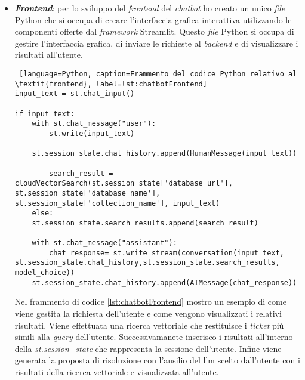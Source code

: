 \begin{itemize}
    Nel frammento di codice \ref{lst:cloudVectorSearch} mostro la funzione di ricerca vettoriale utilizzata nel \textit{chatbot}. Questa funzione si occupa di interrogare il \textit{database} vettoriale MongoDB fornendogli il nome dell'indice, il nome del campo contenente l'\gls{embedding-g} e l'\gls{embedding-g} del testo della \textit{query} dell'utente. La funzione restituisce i tre \textit{ticket} più simili alla \textit{query} dell'utente filtrandoli per i campi desiderati.
    \item \textbf{\textit{Frontend}}: per lo sviluppo del \textit{frontend} del \textit{chatbot} ho creato un unico \textit{file} Python che si occupa di creare l'interfaccia grafica interattiva utilizzando le componenti offerte dal \textit{framework} Streamlit. Questo \textit{file} Python si occupa di gestire l'interfaccia grafica, di inviare le richieste al \textit{backend} e di visualizzare i risultati all'utente.
    \begin{lstlisting} [language=Python, caption=Frammento del codice Python relativo al \textit{frontend}, label=lst:chatbotFrontend]
input_text = st.chat_input()

if input_text:
    with st.chat_message("user"):
        st.write(input_text)

    st.session_state.chat_history.append(HumanMessage(input_text))

        search_result = cloudVectorSearch(st.session_state['database_url'], st.session_state['database_name'], st.session_state['collection_name'], input_text)
    else:
    st.session_state.search_results.append(search_result)

    with st.chat_message("assistant"):
        chat_response= st.write_stream(conversation(input_text, st.session_state.chat_history,st.session_state.search_results, model_choice))
    st.session_state.chat_history.append(AIMessage(chat_response))
\end{lstlisting}
Nel frammento di codice \ref{lst:chatbotFrontend} mostro un esempio di come viene gestita la richiesta dell'utente e come vengono visualizzati i relativi risultati. Viene effettuata una ricerca vettoriale che restituisce i \textit{ticket} più simili alla \textit{query} dell'utente. 
Successivamanete inserisco i risultati all'interno della \textit{st.session\_state} che rappresenta la sessione dell'utente. Infine viene generata la proposta di risoluzione con l'ausilio del \gls{llm} scelto dall'utente con i risultati della ricerca vettoriale e visualizzata all'utente.
\end{itemize}

